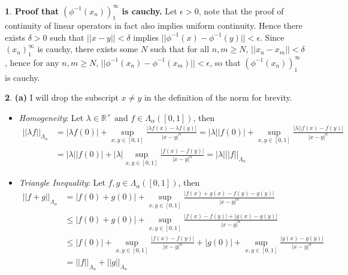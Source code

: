 \documentclass[10.5pt]{article}
\theoremstyle{definition}
\newtheorem{pb}{}
\newcommand{\abs}[1]{\left\vert#1\right\vert}
\newcommand{\norm}[1]{\lvert\lvert#1\rvert\rvert}
\newcommand{\tand}{\text{ and }}
\begin{document}
\begin{pb}
        \textbf{Proof that }\((\phi^{-1}(x_n))_1^\infty\) \textbf{is cauchy.} Let \(\epsilon > 0\), note that the proof of continuity of linear operators in fact also implies uniform continuity. Hence there exists \(\delta > 0\) such that \(\norm{x-y} < \delta\) implies \(\norm{\phi^{-1}(x) - \phi^{-1}(y)} < \epsilon\). Since \((x_n)_1^\infty\) is cauchy, there exists some \(N\) such that for all \(n,m \geq N\), \(\norm{x_n - x_m} < \delta\), hence for any \(n,m \geq N\), \(\norm{\phi^{-1}(x_n) - \phi^{-1}(x_m)} < \epsilon\), so that \((\phi^{-1}(x_n))_1^\infty\) is cauchy.
        \end{pb}

        \begin{pb}
            \textbf{(a)} I will drop the subscript \(x \neq y\) in the definition of the norm for brevity.
            \begin{itemize}
                \item \emph{Homogeneity}: Let \(\lambda \in \mathbb{R}^\times \tand f \in \Lambda_\alpha([0,1])\), then
                \begin{align*}
                    \norm{\lambda f}_{\Lambda_\alpha} &= \abs{\lambda f(0)} + \sup_{x,y \in [0,1]} \frac{\abs{\lambda f(x) - \lambda f(y)}}{\abs{x - y}^\alpha}
                    = \abs{\lambda}\abs{f(0)} + \sup_{x,y \in [0,1]} \frac{\abs{\lambda}\abs{f(x) - f(y)}}{\abs{x - y}^\alpha} \\
                    &= \abs{\lambda}\abs{f(0)} + \abs{\lambda}\sup_{x,y \in [0,1]} \frac{\abs{f(x) - f(y)}}{\abs{x - y}^\alpha} = \abs{\lambda}\norm{f}_{\Lambda_\alpha}
                \end{align*}
                \item \emph{Triangle Inequality}: Let \(f,g \in \Lambda_\alpha([0,1])\), then
                \begin{align*}
                    \norm{f + g}_{\Lambda_\alpha} &= \abs{f(0) + g(0)} + \sup_{x,y \in [0,1]} \frac{\abs{f(x) + g(x) - f(y) - g(y)}}{\abs{x - y}^\alpha} \\
                    &\leq \abs{f(0) + g(0)} + \sup_{x,y \in [0,1]} \frac{\abs{f(x) - f(y)} + \abs{g(x) - g(y)}}{\abs{x - y}^\alpha} \\
                    &\leq \abs{f(0)} + \sup_{x,y \in [0,1]} \frac{\abs{f(x) - f(y)}}{\abs{x - y}^\alpha} + \abs{g(0)} + \sup_{x,y \in [0,1]} \frac{\abs{g(x) - g(y)}}{\abs{x - y}^\alpha} \\
                    &= \norm{f}_{\Lambda_\alpha} + \norm{g}_{\Lambda_\alpha}
                \end{align*}

\end{itemize}
\end{pb}
\end{document}
